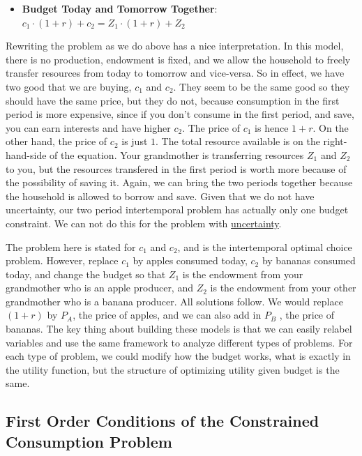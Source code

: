 \documentclass[
]{book}
\providecommand{\tightlist}{%
  \setlength{\itemsep}{0pt}\setlength{\parskip}{0pt}}
\begin{document}
\begin{itemize}
\tightlist
\item
  \textbf{Budget Today and Tomorrow Together}:
  \(c_1 \cdot (1+r)+c_2 =Z_1 \cdot (1+r)+Z_2\)
\end{itemize}

Rewriting the problem as we do above has a nice interpretation. In this
model, there is no production, endowment is fixed, and we allow the
household to freely transfer resources from today to tomorrow and
vice-versa. So in effect, we have two good that we are buying, \(c_1\) and
\(c_2\). They seem to be the same good so they should have the same price,
but they do not, because consumption in the first period is more
expensive, since if you don't consume in the first period, and save, you
can earn interests and have higher \(c_2\). The price of \(c_1\) is hence
\(1+r\). On the other hand, the price of \(c_2\) is just \(1\). The total
resource available is on the right-hand-side of the equation. Your
grandmother is transferring resources \(Z_1\) and \(Z_2\) to you, but the
resources transfered in the first period is worth more because of the
possibility of saving it. Again, we can bring the two periods together
because the household is allowed to borrow and save. Given that we do
not have uncertainty, our two period intertemporal problem has actually
only one budget constraint. We can not do this for the problem with
\href{https://math4econ.github.io/uncertainty/RiskyAsset.html}{uncertainty}.

The problem here is stated for \(c_1\) and \(c_2\), and is the intertemporal
optimal choice problem. However, replace \(c_1\) by apples consumed today,
\(c_2\) by bananas consumed today, and change the budget so that \(Z_1\) is
the endowment from your grandmother who is an apple producer, and \(Z_2\)
is the endowment from your other grandmother who is a banana producer.
All solutions follow. We would replace \((1+r)\) by \(P_A\), the price of
apples, and we can also add in \(P_B\) , the price of bananas. The key
thing about building these models is that we can easily relabel
variables and use the same framework to analyze different types of
problems. For each type of problem, we could modify how the budget
works, what is exactly in the utility function, but the structure of
optimizing utility given budget is the same.

\hypertarget{first-order-conditions-of-the-constrained-consumption-problem}{%
\subsection{First Order Conditions of the Constrained Consumption Problem}\label{first-order-conditions-of-the-constrained-consumption-problem}}
\end{document}
